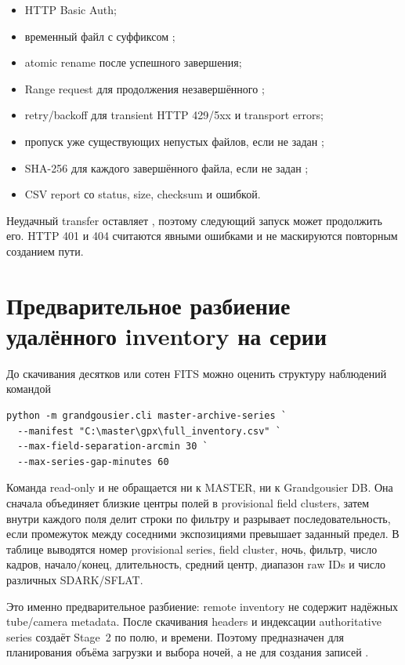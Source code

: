 \begin{itemize}
  \item HTTP Basic Auth;
  \item временный файл с суффиксом ;
  \item atomic rename после успешного завершения;
  \item Range request для продолжения незавершённого ;
  \item retry/backoff для transient HTTP 429/5xx и transport errors;
  \item пропуск уже существующих непустых файлов, если не задан ;
  \item SHA-256 для каждого завершённого файла, если не задан ;
  \item CSV report  со status, size, checksum и ошибкой.
\end{itemize}

Неудачный transfer оставляет , поэтому следующий запуск может продолжить его. HTTP 401 и 404 считаются явными ошибками и не маскируются повторным созданием пути.


\section{Предварительное разбиение удалённого inventory на серии}

До скачивания десятков или сотен FITS можно оценить структуру наблюдений командой

\begin{verbatim}
python -m grandgousier.cli master-archive-series `
  --manifest "C:\master\gpx\full_inventory.csv" `
  --max-field-separation-arcmin 30 `
  --max-series-gap-minutes 60
\end{verbatim}

Команда read-only и не обращается ни к MASTER, ни к Grandgousier DB. Она сначала объединяет близкие центры полей в provisional field clusters, затем внутри каждого поля делит строки по фильтру и разрывает последовательность, если промежуток между соседними экспозициями превышает заданный предел. В таблице выводятся номер provisional series, field cluster, ночь, фильтр, число кадров, начало/конец, длительность, средний центр, диапазон raw IDs и число различных SDARK/SFLAT.

Это именно предварительное разбиение: remote  inventory не содержит надёжных tube/camera metadata. После скачивания headers и индексации authoritative series создаёт Stage~2 по полю,  и времени. Поэтому  предназначен для планирования объёма загрузки и выбора ночей, а не для создания записей .

